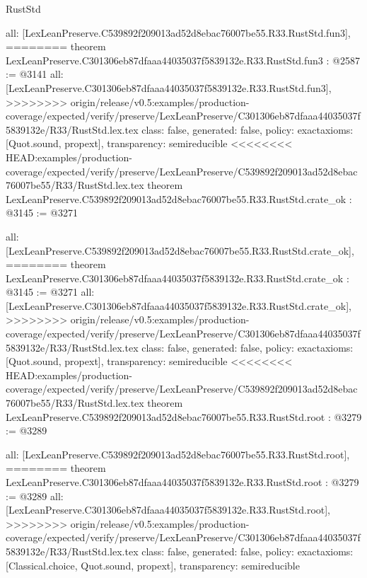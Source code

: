 \begin{lexlean}{RustStd}
\begin{coremodule}
{\begin{coremodule}
{{{{{{  all: [LexLeanPreserve.C539892f209013ad52d8ebac76007be55.R33.RustStd.fun3],
========
theorem LexLeanPreserve.C301306eb87dfaaa44035037f5839132e.R33.RustStd.fun3 : @2587 := @3141 {
  all: [LexLeanPreserve.C301306eb87dfaaa44035037f5839132e.R33.RustStd.fun3],
>>>>>>>> origin/release/v0.5:examples/production-coverage/expected/verify/preserve/LexLeanPreserve/C301306eb87dfaaa44035037f5839132e/R33/RustStd.lex.tex
  class: false,
  generated: false,
  policy: exact{axioms: [Quot.sound, propext]},
  transparency: semireducible
}
<<<<<<<< HEAD:examples/production-coverage/expected/verify/preserve/LexLeanPreserve/C539892f209013ad52d8ebac76007be55/R33/RustStd.lex.tex
theorem LexLeanPreserve.C539892f209013ad52d8ebac76007be55.R33.RustStd.crate_ok : @3145 := @3271 {
  all: [LexLeanPreserve.C539892f209013ad52d8ebac76007be55.R33.RustStd.crate_ok],
========
theorem LexLeanPreserve.C301306eb87dfaaa44035037f5839132e.R33.RustStd.crate_ok : @3145 := @3271 {
  all: [LexLeanPreserve.C301306eb87dfaaa44035037f5839132e.R33.RustStd.crate_ok],
>>>>>>>> origin/release/v0.5:examples/production-coverage/expected/verify/preserve/LexLeanPreserve/C301306eb87dfaaa44035037f5839132e/R33/RustStd.lex.tex
  class: false,
  generated: false,
  policy: exact{axioms: [Quot.sound, propext]},
  transparency: semireducible
}
<<<<<<<< HEAD:examples/production-coverage/expected/verify/preserve/LexLeanPreserve/C539892f209013ad52d8ebac76007be55/R33/RustStd.lex.tex
theorem LexLeanPreserve.C539892f209013ad52d8ebac76007be55.R33.RustStd.root : @3279 := @3289 {
  all: [LexLeanPreserve.C539892f209013ad52d8ebac76007be55.R33.RustStd.root],
========
theorem LexLeanPreserve.C301306eb87dfaaa44035037f5839132e.R33.RustStd.root : @3279 := @3289 {
  all: [LexLeanPreserve.C301306eb87dfaaa44035037f5839132e.R33.RustStd.root],
>>>>>>>> origin/release/v0.5:examples/production-coverage/expected/verify/preserve/LexLeanPreserve/C301306eb87dfaaa44035037f5839132e/R33/RustStd.lex.tex
  class: false,
  generated: false,
  policy: exact{axioms: [Classical.choice, Quot.sound, propext]},
  transparency: semireducible
}

}}}}}}}}
\end{coremodule}}
\end{coremodule}
\end{lexlean}
